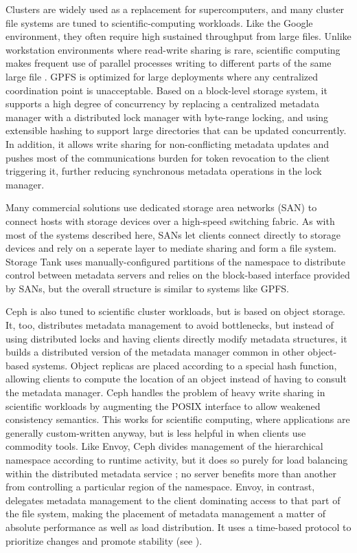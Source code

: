 Clusters are widely used as a replacement for supercomputers, and many cluster file systems are tuned to scientific-computing workloads. Like the Google environment, they often require high sustained throughput from large files. Unlike workstation environments where read-write sharing is rare, scientific computing makes frequent use of parallel processes writing to different parts of the same large file \cite{wang04}. GPFS \cite{schmuck} is optimized for large deployments where any centralized coordination point is unacceptable. Based on a block-level storage system, it supports a high degree of concurrency by replacing a centralized metadata manager with a distributed lock manager with byte-range locking, and using extensible hashing to support large directories that can be updated concurrently. In addition, it allows write sharing for non-conflicting metadata updates and pushes most of the communications burden for token revocation to the client triggering it, further reducing synchronous metadata operations in the lock manager.

Many commercial solutions use dedicated storage area networks (SAN) to connect hosts with storage devices over a high-speed switching fabric. As with most of the systems described here, SANs let clients connect directly to storage devices and rely on a seperate layer to mediate sharing and form a file system. Storage Tank \cite{menon} uses manually-configured partitions of the namespace to distribute control between metadata servers and relies on the block-based interface provided by SANs, but the overall structure is similar to systems like GPFS.

Ceph \cite{weil06} is also tuned to scientific cluster workloads, but is based on object storage. It, too, distributes metadata management to avoid bottlenecks, but instead of using distributed locks and having clients directly modify metadata structures, it builds a distributed version of the metadata manager common in other object-based systems. Object replicas are placed according to a special hash function, allowing clients to compute the location of an object instead of having to consult the metadata manager. Ceph handles the problem of heavy write sharing in scientific workloads by augmenting the POSIX interface to allow weakened consistency semantics. This works for scientific computing, where applications are generally custom-written anyway, but is less helpful in when clients use commodity tools. Like Envoy, Ceph divides management of the hierarchical namespace according to runtime activity, but it does so purely for load balancing within the distributed metadata service \cite{weil04}; no server benefits more than another from controlling a particular region of the namespace. Envoy, in contrast, delegates metadata management to the client dominating access to that part of the file system, making the placement of metadata management a matter of absolute performance as well as load distribution. It uses a time-based protocol to prioritize changes and promote stability (see ).

